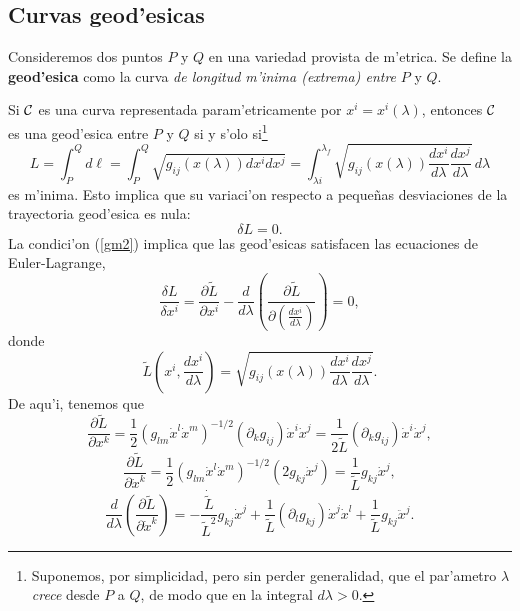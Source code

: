 \subsection{Curvas geod'esicas}

Consideremos dos puntos $P$ y $Q$ en una variedad provista de m'etrica.
Se define la \textbf{geod'esica} como la curva \textit{de longitud m'inima  (extrema) entre} $P$ y $Q$.

Si $\cal C$ es una curva representada param'etricamente por
$x^i =x^i (\lambda)$, entonces $\cal C$ es una geod'esica entre $P$ y $Q$ si y
s'olo si\footnote{Suponemos, por simplicidad, pero sin perder generalidad, que el par'ametro $\lambda$ \textit{crece} desde $P$ a $Q$, de modo que en la integral $d\lambda>0$.}
\begin{equation}
L=\int_P^Qd\ell= \int_P^Q\sqrt{g_{ij}(x(\lambda))dx^idx^j}=\int_{\lambda i}^{\lambda_{f}}\sqrt{g_{ij}(x(\lambda))\frac{dx^i}{d\lambda}\frac{dx^j }{d\lambda}}\, d\lambda \label{gm1}
\end{equation}
es m'inima. Esto implica que su variaci'on respecto a peque\~nas desviaciones de la trayectoria geod'esica es nula:
\begin{equation}
\delta L=0. \label{gm2}
\end{equation}
La condici'on (\ref{gm2}) implica que las geod'esicas satisfacen las ecuaciones de Euler-Lagrange,
\begin{equation}
\frac{\delta L}{\delta x^i }=\frac{\partial \tilde{L}}{\partial x^i }-\frac
{d}{d\lambda}\left( \frac{\partial
\tilde{L}}{\partial\left(\frac{dx^i}{d\lambda}\right) }\right) =0,
\label{gm3}
\end{equation}
donde
\begin{equation}
\tilde{L}(x^i,\frac{dx^i}{d\lambda})=\sqrt{g_{ij}(x(\lambda))\frac{dx^i
}{d\lambda}\frac{dx^j }{d\lambda}}.
\label{gm4}
\end{equation}
De aqu'i, tenemos que
\begin{equation}
\frac{\partial\tilde{L}}{\partial x^k}=\frac{1}{2}(g_{lm}\dot{x}^l\dot{x}^m)^{-1/2}(\partial_k g_{ij})\dot{x}^i\dot{x}^j=\frac{1}{2\tilde{L}}(\partial_k g_{ij})\dot{x}^i\dot{x}^j,
\end{equation}
\begin{equation}
\frac{\partial\tilde{L}}{\partial \dot{x}^k}=\frac{1}{2}(g_{lm}\dot{x}^l\dot{x}^m)^{-1/2}(2g_{kj}\dot{x}^j)=\frac{1}{\tilde{L}}g_{kj}\dot{x}^j,
\end{equation}
\begin{equation}
\frac{d}{d\lambda}\left(\frac{\partial\tilde{L}}{\partial \dot{x}^k}\right)= -\frac{\dot{\tilde{L}}}{\tilde{L}^2}g_{kj}\dot{x}^j+\frac{1}{\tilde{L}}(\partial_l g_{kj})\dot{x}^j\dot{x}^l+\frac{1}{\tilde{L}}g_{kj}\ddot{x}^j.
\end{equation}
